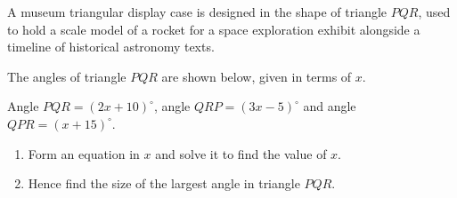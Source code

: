 \begin{question}
\noindent A museum triangular display case is designed in the shape of triangle $PQR$, used to hold a scale model of a rocket for a space exploration exhibit alongside a timeline of historical astronomy texts.

The angles of triangle $PQR$ are shown below, given in terms of $x$.

\begin{center}
\end{center}

\noindent Angle $PQR = (2x+10)^\circ$, angle $QRP = (3x-5)^\circ$ and angle $QPR = (x+15)^\circ$.

\begin{enumerate}
    \item[(a)] Form an equation in $x$ and solve it to find the value of $x$.
    \vspace{3.5cm}

    \item[(b)] Hence find the size of the largest angle in triangle $PQR$.
    \vspace{2.5cm}
\end{enumerate}
\end{question}